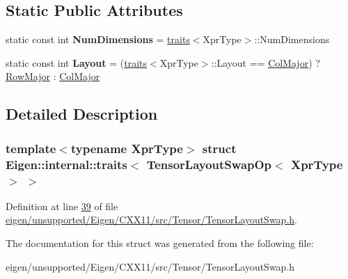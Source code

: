 \subsection*{Static Public Attributes}
\begin{DoxyCompactItemize}
\item 
\mbox{\label{struct_eigen_1_1internal_1_1traits_3_01_tensor_layout_swap_op_3_01_xpr_type_01_4_01_4_a005c8fe3acf9a3a63914464db8b875ba}} 
static const int {\bfseries Num\+Dimensions} = \hyperlink{struct_eigen_1_1internal_1_1traits}{traits}$<$Xpr\+Type$>$\+::Num\+Dimensions
\item 
\mbox{\label{struct_eigen_1_1internal_1_1traits_3_01_tensor_layout_swap_op_3_01_xpr_type_01_4_01_4_ae48951128e9373761eab0e1caaaeb7fc}} 
static const int {\bfseries Layout} = (\hyperlink{struct_eigen_1_1internal_1_1traits}{traits}$<$Xpr\+Type$>$\+::Layout == \hyperlink{group__enums_ggaacded1a18ae58b0f554751f6cdf9eb13a0cbd4bdd0abcfc0224c5fcb5e4f6669a}{Col\+Major}) ? \hyperlink{group__enums_ggaacded1a18ae58b0f554751f6cdf9eb13acfcde9cd8677c5f7caf6bd603666aae3}{Row\+Major} \+: \hyperlink{group__enums_ggaacded1a18ae58b0f554751f6cdf9eb13a0cbd4bdd0abcfc0224c5fcb5e4f6669a}{Col\+Major}
\end{DoxyCompactItemize}


\subsection{Detailed Description}
\subsubsection*{template$<$typename Xpr\+Type$>$\newline
struct Eigen\+::internal\+::traits$<$ Tensor\+Layout\+Swap\+Op$<$ Xpr\+Type $>$ $>$}



Definition at line \hyperlink{eigen_2unsupported_2_eigen_2_c_x_x11_2src_2_tensor_2_tensor_layout_swap_8h_source_l00039}{39} of file \hyperlink{eigen_2unsupported_2_eigen_2_c_x_x11_2src_2_tensor_2_tensor_layout_swap_8h_source}{eigen/unsupported/\+Eigen/\+C\+X\+X11/src/\+Tensor/\+Tensor\+Layout\+Swap.\+h}.



The documentation for this struct was generated from the following file\+:\begin{DoxyCompactItemize}
\item 
eigen/unsupported/\+Eigen/\+C\+X\+X11/src/\+Tensor/\+Tensor\+Layout\+Swap.\+h\end{DoxyCompactItemize}
